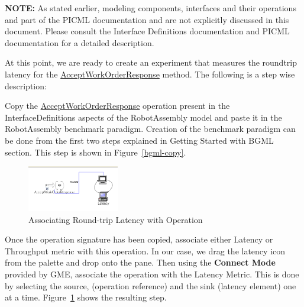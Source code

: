 \documentclass[onecolumn]{article}
\begin{document}
{\bf NOTE:} As stated earlier, modeling components, interfaces and their
operations and part of the PICML documentation and are not explicitly
discussed in this document. Please consult the Interface Definitions
documentation and PICML documentation for a detailed description.

At this point, we are ready to create an experiment that measures the
roundtrip latency for the \url{AcceptWorkOrderResponse} method. The
following is a step wise description:

\smallskip
{} Copy the \url{AcceptWorkOrderResponse} operation
present in the InterfaceDefinitions aspects of the RobotAssembly model
and paste it in the RobotAssembly benchmark paradigm. Creation of the
benchmark paradigm can be done from the first two steps explained in
Getting Started with BGML section. This step is shown in
Figure~\ref{bgml-copy}.

\begin{figure}[ht]
{
 \includegraphics[width=4cm]{BGML-Latency.png}
 \caption{Associating Round-trip Latency with Operation}
 \label{bgml-latency}
}
\end{figure}

\smallskip
{} Once the operation signature has been copied,
associate either Latency or Throughput metric with this operation. In
our case, we drag the latency icon from the palette and drop onto the
pane. Then using the {\bf Connect Mode} provided by GME, associate the
operation with the Latency Metric. This is done by selecting the
source, (operation reference) and the sink (latency element) one at a
time. Figure~\ref{bgml-latency} shows the resulting step.
\end{document}
